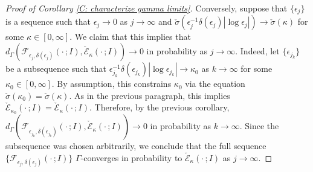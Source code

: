 \documentclass[10pt,a4paper]{amsart}
\begin{document}
\begin{proof}[Proof of Corollary \ref{C: characterize gamma limits}]
Conversely, suppose that $\{\epsilon_{j}\}$ is a sequence such that $\epsilon_{j} \to 0$ as $j \to \infty$ and  $\check{\sigma}(\epsilon_{j}^{-1} \delta(\epsilon_{j}) | \log \epsilon_{j} | ) \to \check{\sigma}(\kappa)$ for some $\kappa \in [0,\infty]$.  We claim that this implies that $d_{\Gamma}( \mathscr{F}_{\epsilon_{j},\delta(\epsilon_{j})}( \cdot \, ; I ) , \check{\mathscr{E}}_{\kappa}(\cdot \, ; I ) ) \to 0$ in probability as $j \to \infty$.  Indeed, let $\{ \epsilon_{j_{k}} \}$ be a subsequence such that $\epsilon^{-1}_{j_{k}} \delta(\epsilon_{j_{k}}) | \log \epsilon_{j_{k}} | \to \kappa_{0}$ as $k \to \infty$ for some $\kappa_{0} \in [0,\infty]$.  By assumption, this constrains $\kappa_{0}$ via the equation $\check{\sigma}(\kappa_{0}) = \check{\sigma}(\kappa)$.  As in the previous paragraph, this implies $\check{\mathscr{E}}_{\kappa_{0}}(\cdot \, ; I ) = \check{\mathscr{E}}_{\kappa}( \cdot \, ; I )$.  Therefore, by the previous corollary, $d_{\Gamma}( \mathscr{F}_{\epsilon_{j_{k}},\delta(\epsilon_{j_{k}})} ( \cdot \, ; I ) , \check{\mathscr{E}}_{\kappa}( \cdot \, ; I ) ) \to 0$ in probability as $k \to \infty$.  Since the subsequence was chosen arbitrarily, we conclude that the full sequence $\{\mathscr{F}_{\epsilon_{j},\delta(\epsilon_{j})}(\cdot \, ; I ) \}$ $\Gamma$-converges in probability to $\check{\mathscr{E}}_{\kappa}(\cdot \, ; I )$ as $j \to \infty$.    \end{proof}
\end{document}
